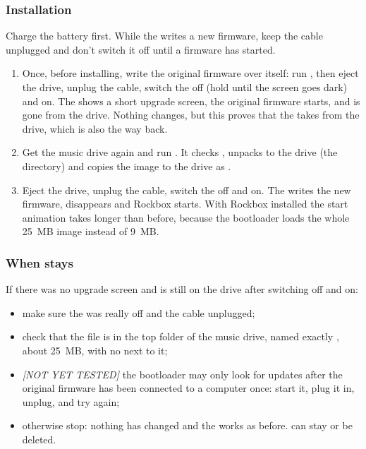 \subsubsection{Installation}
Charge the battery first. While the \dap{} writes a new firmware, keep the
cable unplugged and don't switch it off until a firmware has started.
\begin{enumerate}
  \item Once, before installing, write the original firmware over itself:
    run , then eject
    the drive, unplug the cable, switch the \dap{} off (hold \ButtonPower{}
    until the screen goes dark) and on. The \dap{} shows a short upgrade
    screen, the original firmware starts, and  is gone from the
    drive. Nothing changes, but this proves that the \dap{} takes
     from the drive, which is also the way back.
  \item Get the music drive again and run
    . It checks
    , unpacks  to the drive
    (the  directory) and copies the image to the drive as
    .
  \item Eject the drive, unplug the cable, switch the \dap{} off and on. The
    \dap{} writes the new firmware,  disappears and Rockbox
    starts. With Rockbox installed the start animation takes longer than
    before, because the \playerman{} bootloader loads the whole 25~MB image
    instead of 9~MB.
\end{enumerate}

\subsubsection{When  stays}
If there was no upgrade screen and  is still on the drive after
switching off and on:
\begin{itemize}
  \item make sure the \dap{} was really off and the cable unplugged;
  \item check that the file is in the top folder of the music drive, named
    exactly , about 25~MB, with no  next to it;
  \item \emph{[NOT YET TESTED]} the \playerman{} bootloader may only look for
    updates after the original firmware has been connected to a computer
    once: start it, plug it in, unplug, and try again;
  \item otherwise stop: nothing has changed and the \dap{} works as before.
     can stay or be deleted.
\end{itemize}

